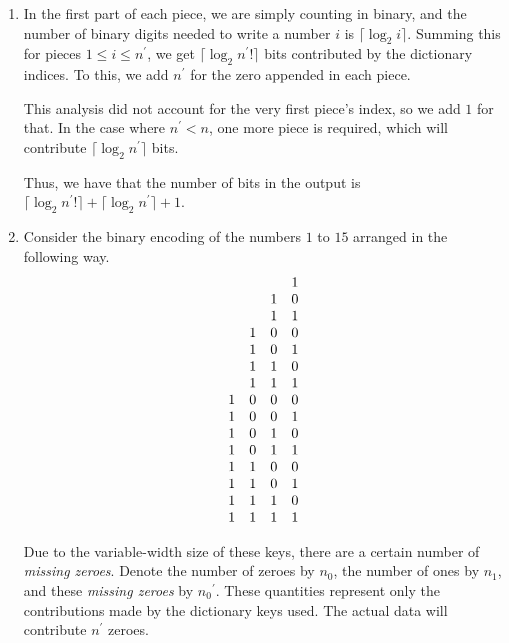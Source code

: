 \documentclass{article}
\begin{document}
\begin{enumerate}
    \item In the first part of each piece, we are simply counting in binary,
        and the number of binary digits needed to write a number $i$ is
        $\lceil\log_2 i \rceil$. Summing this for pieces $1 \leq i \leq
        n^\prime$, we get $\lceil\log_2 {n^\prime !}\rceil$ bits contributed
        by the dictionary indices. To this, we add $n^\prime$ for the zero
        appended in each piece.

        This analysis did not account for the very first piece's index, so we
        add $1$ for that. In the case where $n^\prime < n$, one more piece is
        required, which will contribute $\lceil \log_2 {n^\prime} \rceil$ bits.

        Thus, we have that the number of bits in the output is $\lceil \log_2
        {n^\prime !} \rceil + \lceil \log_2 {n^\prime} \rceil + 1$.

    \item Consider the binary encoding of the numbers $1$ to $15$ arranged in
        the following way.
        $$
        \begin{array}{c c c c}
            ~ & ~ & ~ & 1 \\
            ~ & ~ & 1 & 0 \\
            ~ & ~ & 1 & 1 \\
            ~ & 1 & 0 & 0 \\
            ~ & 1 & 0 & 1 \\
            ~ & 1 & 1 & 0 \\
            ~ & 1 & 1 & 1 \\
            1 & 0 & 0 & 0 \\
            1 & 0 & 0 & 1 \\
            1 & 0 & 1 & 0 \\
            1 & 0 & 1 & 1 \\
            1 & 1 & 0 & 0 \\
            1 & 1 & 0 & 1 \\
            1 & 1 & 1 & 0 \\
            1 & 1 & 1 & 1
        \end{array}
        $$

        Due to the variable-width size of these keys, there are a certain
        number of \emph{missing zeroes}. Denote the number of zeroes by $n_0$,
        the number of ones by $n_1$, and these \emph{missing zeroes} by
        ${n_0}^\prime$. These quantities represent only the contributions made
        by the dictionary keys used. The actual data will contribute $n^\prime$
        zeroes.


\end{enumerate}
\end{document}
